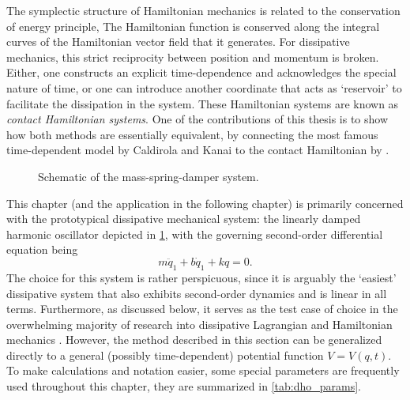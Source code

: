The symplectic structure of Hamiltonian mechanics is related to the conservation of energy principle, The Hamiltonian function is conserved along the integral curves of the Hamiltonian vector field that it generates. For dissipative mechanics, this strict reciprocity between position and momentum is broken. Either, one constructs an explicit time-dependence and acknowledges the special nature of time, or one can introduce another coordinate that acts as `reservoir' to facilitate the dissipation in the system. These Hamiltonian systems are known as \emph{contact Hamiltonian systems}. One of the contributions of this thesis is to show how both methods are essentially equivalent, by connecting the most famous time-dependent model by Caldirola and Kanai to the contact Hamiltonian by \citet{Bravetti2017}.

\begin{figure}[ht!]
    \begin{center}
        
    \end{center}
    \caption{Schematic of the mass-spring-damper system.}
    \label{fig:dho}
\end{figure}
This chapter (and the application in the following chapter) is primarily concerned with the prototypical dissipative mechanical system: the linearly damped harmonic oscillator depicted in \cref{fig:dho}, with the governing second-order differential equation being
\begin{equation}  
  m\ddot{q}_1 + b\dot{q}_1 + kq = 0.
\end{equation}
The choice for this system is rather perspicuous, since it is arguably the `easiest' dissipative system that also exhibits second-order dynamics and is linear in all terms. Furthermore, as discussed below, it serves as the test case of choice in the overwhelming majority of research into dissipative Lagrangian and Hamiltonian mechanics
\cite{Dekker1981,Hutters2020b}. However, the method described in this section can be generalized directly to a general (possibly time-dependent) potential function $V = V(q, t)$. To make calculations and notation easier, some special parameters are frequently used throughout this chapter, they are summarized in \cref{tab:dho_params}.

